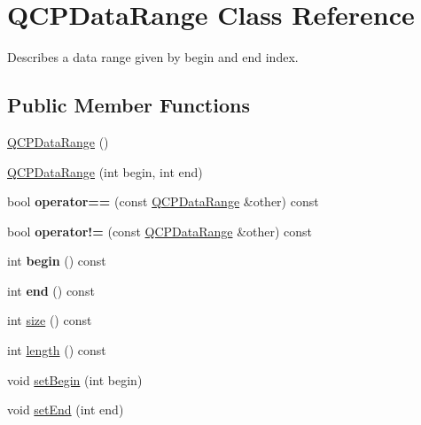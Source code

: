 \hypertarget{class_q_c_p_data_range}{}\section{Q\+C\+P\+Data\+Range Class Reference}
\label{class_q_c_p_data_range}


Describes a data range given by begin and end index.  


\subsection*{Public Member Functions}
\begin{DoxyCompactItemize}
\item 
\mbox{\hyperlink{class_q_c_p_data_range_a49e72fd9bace1da9d875136dcc04c986}{Q\+C\+P\+Data\+Range}} ()
\item 
\mbox{\hyperlink{class_q_c_p_data_range_a6c7f4a3684210423270515403060e9cf}{Q\+C\+P\+Data\+Range}} (int begin, int end)
\item 
\mbox{\label{class_q_c_p_data_range_a8bfd79a282f6ebd766d60caa683242d3}} 
bool {\bfseries operator==} (const \mbox{\hyperlink{class_q_c_p_data_range}{Q\+C\+P\+Data\+Range}} \&other) const
\item 
\mbox{\label{class_q_c_p_data_range_a5bcc9597731a7455407853ed0585f6ab}} 
bool {\bfseries operator!=} (const \mbox{\hyperlink{class_q_c_p_data_range}{Q\+C\+P\+Data\+Range}} \&other) const
\item 
\mbox{\label{class_q_c_p_data_range_ae76d7eba9defdfafcd0fc41096793129}} 
int {\bfseries begin} () const
\item 
\mbox{\label{class_q_c_p_data_range_aee1b20fb045929c3753ee2ce14af7630}} 
int {\bfseries end} () const
\item 
int \mbox{\hyperlink{class_q_c_p_data_range_ac6af055e509d1b691c244954ff1c5887}{size}} () const
\item 
int \mbox{\hyperlink{class_q_c_p_data_range_a1e7836058f755c6ab9f11996477b7150}{length}} () const
\item 
void \mbox{\hyperlink{class_q_c_p_data_range_a54ff59048e01e46ac4aefafc844626c6}{set\+Begin}} (int begin)
\item 
void \mbox{\hyperlink{class_q_c_p_data_range_a277f1a9eafe70b9184d9c00b641ae5de}{set\+End}} (int end)

\end{DoxyCompactItemize}
